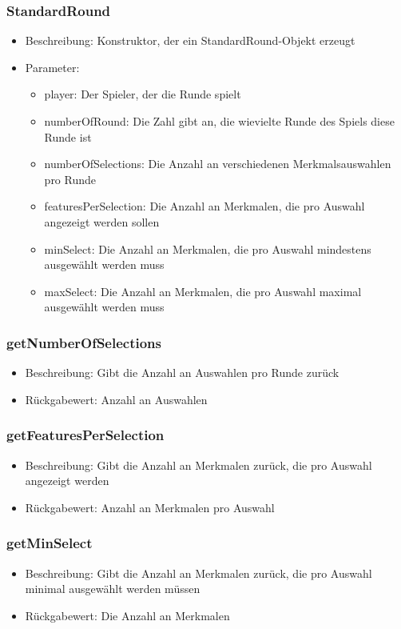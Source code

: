 \documentclass[a4paper]{scrreprt}
\begin{document}
    \subsubsection{StandardRound}
    \begin{itemize}
        \item Beschreibung: Konstruktor, der ein StandardRound-Objekt erzeugt
        \item Parameter:
        \begin{itemize}
            \item player: Der Spieler, der die Runde spielt
            \item numberOfRound: Die Zahl gibt an, die wievielte Runde des Spiels diese Runde ist
            \item numberOfSelections: Die Anzahl an verschiedenen Merkmalsauswahlen pro Runde
            \item featuresPerSelection: Die Anzahl an Merkmalen, die pro Auswahl angezeigt werden sollen
            \item minSelect: Die Anzahl an Merkmalen, die pro Auswahl mindestens ausgewählt werden muss
            \item maxSelect: Die Anzahl an Merkmalen, die pro Auswahl maximal ausgewählt werden muss
        \end{itemize}
    \end{itemize}
    \subsubsection{getNumberOfSelections}
    \begin{itemize}
        \item Beschreibung: Gibt die Anzahl an Auswahlen pro Runde zurück
        \item Rückgabewert: Anzahl an Auswahlen
    \end{itemize}
    \subsubsection{getFeaturesPerSelection}
    \begin{itemize}
        \item Beschreibung: Gibt die Anzahl an Merkmalen zurück, die pro Auswahl angezeigt werden
        \item Rückgabewert: Anzahl an Merkmalen pro Auswahl
    \end{itemize}
    \subsubsection{getMinSelect}
    \begin{itemize}
        \item Beschreibung: Gibt die Anzahl an Merkmalen zurück, die pro Auswahl minimal ausgewählt werden müssen
        \item Rückgabewert: Die Anzahl an Merkmalen
    \end{itemize}
\end{document}
